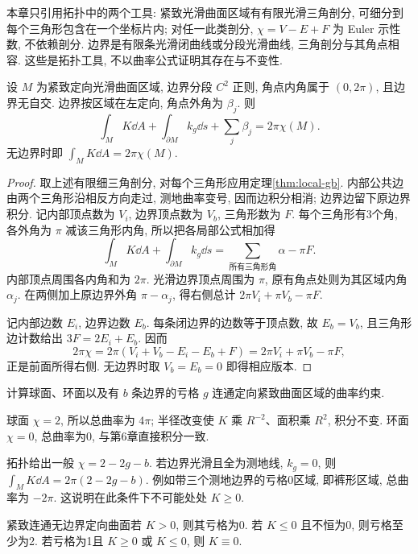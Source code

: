 本章只引用拓扑中的两个工具: 紧致光滑曲面区域有有限光滑三角剖分, 可细分到每个三角形包含在一个坐标片内; 对任一此类剖分, $\chi=V-E+F$ 为 Euler 示性数, 不依赖剖分. 边界是有限条光滑闭曲线或分段光滑曲线, 三角剖分与其角点相容. 这些是拓扑工具, 不以曲率公式证明其存在与不变性.
\begin{theorem}\label{thm:global-gb}
设 $M$ 为紧致定向光滑曲面区域, 边界分段 $C^2$ 正则, 角点内角属于 $(0,2\pi)$, 且边界无自交. 边界按区域在左定向, 角点外角为 $\beta_j$. 则
\begin{equation}\label{eq:global-gb}
 \int_MK\dd A+\int_{\partial M}k_g\dd s+\sum_j\beta_j=2\pi\chi(M).
\end{equation}
无边界时即 $\int_MK\dd A=2\pi\chi(M)$.
\end{theorem}
\begin{proof}
取上述有限细三角剖分, 对每个三角形应用定理\ref{thm:local-gb}. 内部公共边由两个三角形沿相反方向走过, 测地曲率变号, 因而边积分相消; 边界边留下原边界积分. 记内部顶点数为 $V_i$, 边界顶点数为 $V_b$, 三角形数为 $F$. 每个三角形有3个角, 各外角为 $\pi$ 减该三角形内角, 所以把各局部公式相加得
\[
 \int_MK\dd A+\int_{\partial M}k_g\dd s
 =\sum_{\text{所有三角形角}}\alpha-\pi F.
\]
内部顶点周围各内角和为 $2\pi$. 光滑边界顶点周围为 $\pi$, 原有角点处则为其区域内角 $\alpha_j$. 在两侧加上原边界外角 $\pi-\alpha_j$, 得右侧总计 $2\pi V_i+\pi V_b-\pi F$.

记内部边数 $E_i$, 边界边数 $E_b$. 每条闭边界的边数等于顶点数, 故 $E_b=V_b$, 且三角形边计数给出 $3F=2E_i+E_b$. 因而
\[
 2\pi\chi=2\pi(V_i+V_b-E_i-E_b+F)
 =2\pi V_i+\pi V_b-\pi F,
\]
正是前面所得右侧. 无边界时取 $V_b=E_b=0$ 即得相应版本.
\end{proof}
\begin{example}
计算球面、环面以及有 $b$ 条边界的亏格 $g$ 连通定向紧致曲面区域的曲率约束.
\end{example}
\begin{solution}
球面 $\chi=2$, 所以总曲率为 $4\pi$; 半径改变使 $K$ 乘 $R^{-2}$、面积乘 $R^2$, 积分不变. 环面 $\chi=0$, 总曲率为0, 与第6章直接积分一致.

拓扑给出一般 $\chi=2-2g-b$. 若边界光滑且全为测地线, $k_g=0$, 则 $\int_MK\dd A=2\pi(2-2g-b)$. 例如带三个测地边界的亏格0区域, 即裤形区域, 总曲率为 $-2\pi$. 这说明在此条件下不可能处处 $K\ge0$.
\end{solution}
\begin{corollary}
紧致连通无边界定向曲面若 $K>0$, 则其亏格为0. 若 $K\le0$ 且不恒为0, 则亏格至少为2. 若亏格为1且 $K\ge0$ 或 $K\le0$, 则 $K\equiv0$.
\end{corollary}
